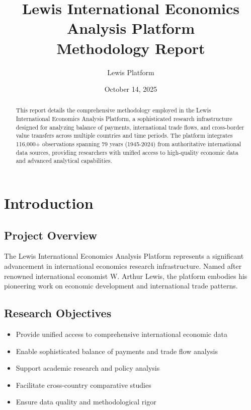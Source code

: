 \documentclass[11pt,a4paper]{article}
\title{\textbf{Lewis International Economics Analysis Platform} \\
\large Methodology Report}
\author{Lewis Platform}
\date{October 14, 2025}
\begin{document}
\maketitle

\begin{abstract}
This report details the comprehensive methodology employed in the Lewis International Economics Analysis Platform, a sophisticated research infrastructure designed for analyzing balance of payments, international trade flows, and cross-border value transfers across multiple countries and time periods. The platform integrates 116,000+ observations spanning 79 years (1945-2024) from authoritative international data sources, providing researchers with unified access to high-quality economic data and advanced analytical capabilities.
\end{abstract}

\tableofcontents
\newpage

\section{Introduction}

\subsection{Project Overview}
The Lewis International Economics Analysis Platform represents a significant advancement in international economics research infrastructure. Named after renowned international economist W. Arthur Lewis, the platform embodies his pioneering work on economic development and international trade patterns.

\subsection{Research Objectives}
\begin{itemize}
    \item Provide unified access to comprehensive international economic data
    \item Enable sophisticated balance of payments and trade flow analysis
    \item Support academic research and policy analysis
    \item Facilitate cross-country comparative studies
    \item Ensure data quality and methodological rigor
\end{itemize}
\end{document}
